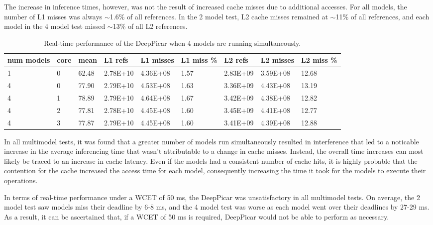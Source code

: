 The increase in inference times, however, was not the result of increased cache misses due to 
additional accesses. For all models, the number of L1 misses was always $\sim$1.6\% of all 
references. In the 2 model test, L2 cache misses remained at $\sim$11\% of all references, and each 
model in the 4 model test missed $\sim$13\% of all L2 references.

\begin{table}
  \centering
  \begin{tabular} {| l | l | l | l | l | l | l | l | l |}
  \hline
  \textbf{num models} & \textbf{core} & \textbf{mean} & \textbf{L1 refs} & \textbf{L1 
    misses} & \textbf{L1 miss \%} & \textbf{L2 refs} & \textbf{L2 misses} & \textbf{L2 miss \%} \\ \hline
    1 & 0 & 62.48 & 2.78E+10 & 4.36E+08 & 1.57 & 2.83E+09 & 3.59E+08 & 12.68 \\ \hline
    4 & 0 & 77.90 & 2.79E+10 & 4.53E+08 & 1.63 & 3.36E+09 & 4.43E+08 & 13.19 \\ \hline
    4 & 1 & 78.89 & 2.79E+10 & 4.64E+08 & 1.67 & 3.42E+09 & 4.38E+08 & 12.82 \\ \hline
    4 & 2 & 77.81 & 2.78E+10 & 4.45E+08 & 1.60 & 3.45E+09 & 4.41E+08 & 12.77 \\ \hline
    4 & 3 & 77.87 & 2.79E+10 & 4.45E+08 & 1.60 & 3.41E+09 & 4.39E+08 & 12.88 \\ \hline
  \end{tabular}
  \caption{Real-time performance of the DeepPicar when 4 models are running simultaneously.}
\end{table}

In all multimodel tests, it was found that a greater number of models run simultaneously resulted in 
interference that led to a noticable increase in the average inferencing time that wasn't 
attributable to a change in cache misses. Instead, the overall time increases can most likely be 
traced to an increase in cache latency. Even if the models had a consistent number of cache hits, it 
is highly probable that the contention for the cache increased the access time for each model, 
consequently increasing the time it took for the models to execute their operations.

In terms of real-time performance under a WCET of 50 ms, the DeepPicar was unsatisfactory in all 
multimodel tests. On average, the 2 model test saw models miss their deadline by 6-8 ms, and the 4 
model test was worse as each model went over their deadlines by 27-29 ms. As a result, it can be 
ascertained that, if a WCET of 50 ms is required, DeepPicar would not be able to perform as necessary.

